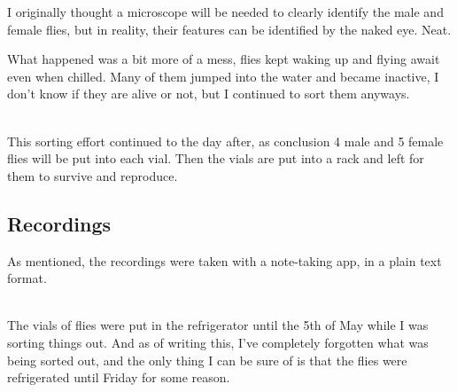 \documentclass{article}
\begin{document}
\noindent
I originally thought a microscope will be needed to clearly identify the male and female flies, but in reality, their features can be identified by the naked eye. Neat.

\begin{figure}[ht]
  \centering
  \hfill
\end{figure}

\noindent
What happened was a bit more of a mess, flies kept waking up and flying await even when chilled. Many of them jumped into the water and became inactive, I don't know if they are alive or not, but I continued to sort them anyways.

\noindent\\
This sorting effort continued to the day after, as conclusion 4 male and 5 female flies will be put into each vial. Then the vials are put into a rack and left for them to survive and reproduce.

\subsection{Recordings}

As mentioned, the recordings were taken with a note-taking app, in a plain text format.

\noindent\\
The vials of flies were put in the refrigerator until the 5th of May while I was sorting things out. And as of writing this, I've completely forgotten what was being sorted out, and the only thing I can be sure of is that the flies were refrigerated until Friday for some reason.
\end{document}
